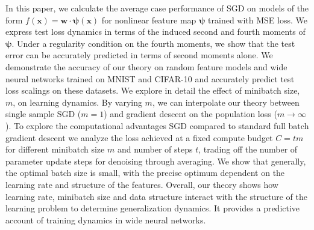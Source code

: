 \documentclass{article} %
\def\x{\bm x}
\def\w{\bm w}
\def\x{\mathbf x}
\def\w{\mathbf w}
\begin{document}

In this paper, we calculate the average case performance of SGD on models of the form $f(\x) = \w \cdot \bm \psi(\x)$ for nonlinear feature map $\bm\psi$ trained with MSE loss. We express test loss dynamics in terms of the induced second and fourth moments of $\bm\psi$. Under a regularity condition on the fourth moments, we show that the test error can be accurately predicted in terms of second moments alone. We demonstrate the accuracy of our theory on random feature models and wide neural networks trained on MNIST and CIFAR-10 and accurately predict test loss scalings on these datasets. We explore in detail the effect of minibatch size, $m$, on learning dynamics. By varying $m$, we can interpolate our theory between single sample SGD ($m=1$) and gradient descent on the population loss ($m\to\infty$). To explore the computational advantages SGD compared to standard full batch gradient descent we analyze the loss achieved at a fixed compute budget $C = t m$ for different minibatch size $m$ and number of steps $t$, trading off the number of parameter update steps for denoising through averaging. We show that generally, the optimal batch size is small, with the precise optimum dependent on the learning rate and structure of the features. Overall, our theory shows how learning rate, minibatch size and data structure interact with the structure of the learning problem to determine generalization dynamics. It provides a predictive account of training dynamics in wide neural networks.
\end{document}
